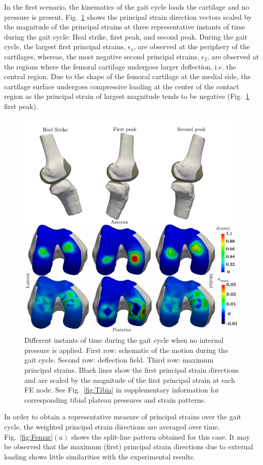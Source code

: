 In the first scenario, the kinematics of the gait cycle loads the cartilage and no pressure is present. Fig.~\ref{fig:Femur_Gait} shows the principal strain direction vectors scaled by the magnitude of the principal strains at three representative instants of time during the gait cycle: Heal strike, first peak, and second peak. During the gait cycle, the largest first principal strains, $\epsilon_1$, are observed at the periphery of the cartilages, whereas, the most negative second principal strains, $\epsilon_2$, are observed at the regions where the femoral cartilage undergoes larger deflection, i.e. the central region. Due to the shape of the femoral cartilage at the medial side, the cartilage surface undergoes compressive loading at the center of the contact region as the principal strain of largest magnitude tends to be negative (Fig.~\ref{fig:Femur_Gait} first peak).
\begin{figure}
	\begin{center}
		\includegraphics[width=\columnwidth]{images/AC/Femur_Gait.png}
		\caption{Different instants of time during the gait cycle when no internal pressure is applied. First row: schematic of the motion during the gait cycle. Second row: deflection field. Third row: maximum principal strains. Black lines show the first principal strain directions and are scaled by the magnitude of the first principal strain at each FE node. See Fig.~\ref{fig:Tibia} in supplementary information for corresponding tibial plateau pressures and strain patterns.}\label{fig:Femur_Gait}
	\end{center}
\end{figure}
In order to obtain a representative measure of principal strains over the gait cycle, the weighted principal strain directions are averaged over time. Fig.~\ref{fig:Femur}$(a)$ shows the split-line pattern obtained for this case. It may be observed that the maximum (first) principal strain directions due to external loading shows little similarities with the experimental results.

